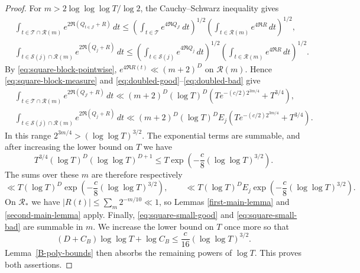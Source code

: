 \documentclass[twoside,reqno,11pt,a4paper]{amsart}
\numberwithin{equation}{section}
\theoremstyle{plain}
\theoremstyle{definition}
\theoremstyle{remark}
\renewcommand{\le}{\leqslant}
\begin{document}
\begin{proof}
For $m>2\log\log\log T/\log2$, the Cauchy--Schwarz inequality gives
\begin{align*}
&\int_{t\in \mathcal T\cap\mathcal R(m)}
e^{2\Re(Q_{t\in \mathcal J}+R)}\,dt\le
\left(\int_{t\in \mathcal T}e^{4\Re Q_{\mathcal J}}\,dt\right)^{1/2}
\left(\int_{t\in \mathcal R(m)}e^{4\Re R}\,dt\right)^{1/2},
\\
&\int_{t\in \mathcal S(j)\cap\mathcal R(m)}
e^{2\Re(Q_j+R)}\,dt \le
\left(\int_{t\in \mathcal S(j)}e^{4\Re Q_j}\,dt\right)^{1/2}
\left(\int_{t\in \mathcal R(m)}e^{4\Re R}\,dt\right)^{1/2}.
\end{align*}
By \eqref{eq:square-block-pointwise},
$e^{4\Re R(t)}\ll(m+2)^D$ on $\mathcal R(m)$.  Hence
\eqref{eq:square-block-measure} and
\eqref{eq:doubled-good}--\eqref{eq:doubled-bad} give
\begin{align*}
&\int_{t\in \mathcal T\cap\mathcal R(m)}
e^{2\Re(Q_{\mathcal J}+R)}\,dt\ll(m+2)^D(\log T)^D
\left(Te^{-(c/2)2^{3m/4}}+T^{3/4}\right),
\\
&\int_{t\in \mathcal S(j)\cap\mathcal R(m)}
e^{2\Re(Q_j+R)}\,dt \ll(m+2)^D(\log T)^DE_j
\left(Te^{-(c/2)2^{3m/4}}+T^{3/4}\right).
\end{align*}
In this range $2^{3m/4}>(\log\log T)^{3/2}$.  The exponential terms are
summable, and after increasing the lower bound on $T$ we have
\begin{equation*}
T^{3/4}(\log T)^D(\log\log T)^{D+1}
\le T\exp\left(-\frac c8(\log\log T)^{3/2}\right).
\end{equation*}
The sums over these $m$ are therefore respectively
\begin{equation*}
\ll T(\log T)^D
\exp\left(-\frac c8(\log\log T)^{3/2}\right),
\qquad
\ll T(\log T)^DE_j
\exp\left(-\frac c8(\log\log T)^{3/2}\right).
\end{equation*}
On $\mathcal R_*$ we have $|R(t)|\le\sum_m2^{-m/10}\ll1$, so Lemmas
\ref{first-main-lemma} and \ref{second-main-lemma} apply.  Finally,
\eqref{eq:square-small-good} and \eqref{eq:square-small-bad} are summable in
$m$.  We increase the lower bound on $T$ once more so that
\begin{equation*}
(D+C_B)\log\log T+\log C_B
\le\frac c{16}(\log\log T)^{3/2}.
\end{equation*}
Lemma~\ref{B-poly-bounds} then absorbs the remaining powers of $\log T$.
This proves both assertions.
\end{proof}
\end{document}
